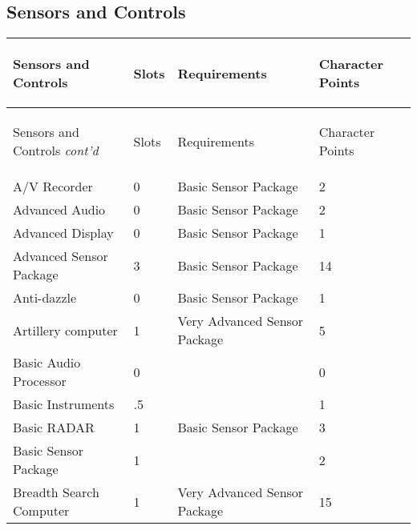 \documentclass[twoside]{book}
\begin{document}
\begin{multicols}{2}


\hspace{-3.75ex}
\vspace{1ex}


    
\end{multicols}
  
    

\subsection{Sensors and Controls}
    
\begin{longtable}{p{1.25in}lll} 
  Sensors and Controls& \begin{turn}{70}{Slots}\end{turn}
          & \begin{turn}{70}{Requirements}\end{turn}
          & \begin{turn}{70}{Character Points}\end{turn}
          \\
  \hline
  \hline
  \endfirsthead
  Sensors and Controls \textit{cont'd}
        & \begin{turn}{70}{Slots}\end{turn}
          & \begin{turn}{70}{Requirements}\end{turn}
          & \begin{turn}{70}{Character Points}\end{turn}
           \\
  \hline
  \endhead
\raggedright A/V Recorder&0&Basic Sensor Package&2\tabularnewline
      \raggedright Advanced Audio&0&Basic Sensor Package&2\tabularnewline
      \raggedright Advanced Display&0&Basic Sensor Package&1\tabularnewline
      \raggedright Advanced Sensor Package&3&Basic Sensor Package&14\tabularnewline
      \raggedright Anti-dazzle&0&Basic Sensor Package&1\tabularnewline
      \raggedright Artillery computer&1&Very Advanced Sensor Package&5\tabularnewline
      \raggedright Basic Audio Processor&0&&0\tabularnewline
      \raggedright Basic Instruments&.5&&1\tabularnewline
      \raggedright Basic RADAR&1&Basic Sensor Package&3\tabularnewline
      \raggedright Basic Sensor Package&1&&2\tabularnewline
      \raggedright Breadth Search Computer&1&Very Advanced Sensor Package&15\tabularnewline

\end{longtable}
\end{document}
